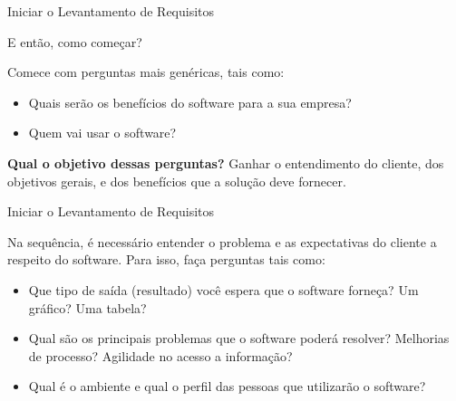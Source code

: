 \documentclass[xcolor=x11names,compress]{beamer}
\begin{document}
\begin{frame}{Iniciar o Levantamento de Requisitos}

\begin{alertblock}{\centering E então, como começar?}
\end{alertblock}

\pause

Comece com perguntas mais genéricas, tais como: 

\begin{itemize}[<+->]
\itemsep 5mm

\item Quais serão os benefícios do software para a sua empresa?

\item Quem vai usar o software?

\end{itemize}

\pause

\begin{alertblock}{\centering \textbf{Qual o objetivo dessas perguntas?}}
Ganhar o entendimento do cliente, dos objetivos gerais, e dos benefícios que a solução deve fornecer.
\end{alertblock}

\end{frame}

\begin{frame} {Iniciar o Levantamento de Requisitos}

Na sequência, é necessário entender o problema e as expectativas do cliente a respeito do software. Para isso, faça perguntas tais como:

\begin{itemize}[<+->]
\itemsep 5mm

\item Que tipo de saída (resultado) você espera que o software forneça? Um gráfico? Uma tabela?

\item Qual são os principais problemas que o software poderá resolver? Melhorias de processo? Agilidade no acesso a informação?

\item Qual é o ambiente e qual o perfil das pessoas que utilizarão o software?

\end{itemize}

\end{frame}
\end{document}
